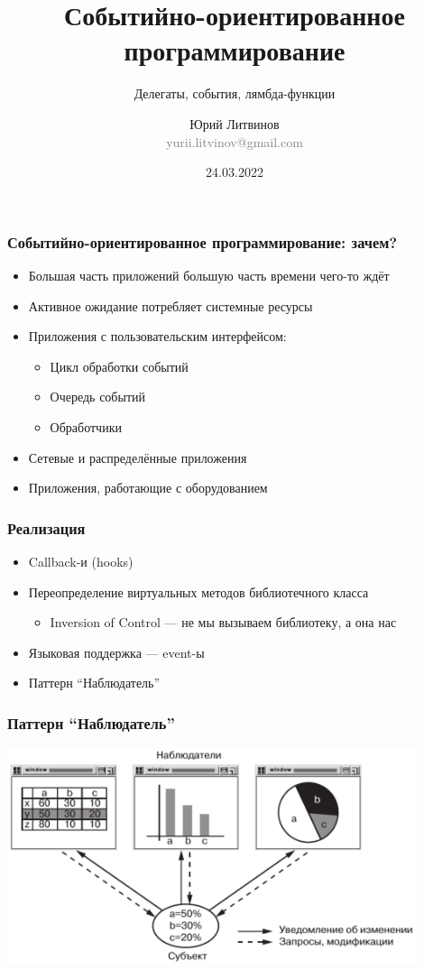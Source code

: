 \documentclass[xetex,mathserif,serif]{beamer}
\title{Событийно-ориентированное программирование}
\subtitle{Делегаты, события, лямбда-функции}
\author[Юрий Литвинов]{Юрий Литвинов\\\small{\textcolor{gray}{yurii.litvinov@gmail.com}}}
\date{24.03.2022}
\begin{document}
    \frame{\titlepage}

        \begin{frame}
        \frametitle{Событийно-ориентированное программирование: зачем?}
        \begin{itemize}
            \item Большая часть приложений большую часть времени чего-то ждёт
            \item Активное ожидание потребляет системные ресурсы
            \item Приложения с пользовательским интерфейсом:
            \begin{itemize}
                \item Цикл обработки событий
                \item Очередь событий
                \item Обработчики
            \end{itemize}
            \item Сетевые и распределённые приложения
            \item Приложения, работающие с оборудованием
        \end{itemize}
    \end{frame}

    \begin{frame}
        \frametitle{Реализация}
        \begin{itemize}
            \item Callback-и (hooks)
            \item Переопределение виртуальных методов библиотечного класса
            \begin{itemize}
                \item Inversion of Control --- не мы вызываем библиотеку, а она нас
            \end{itemize}
            \item Языковая поддержка --- event-ы
            \item Паттерн ``Наблюдатель''
        \end{itemize}
    \end{frame}

    \begin{frame}
        \frametitle{Паттерн ``Наблюдатель''}
        \begin{center}
            \includegraphics[width=0.9\textwidth]{observerExample.png}
        \end{center}
    \end{frame}
\end{document}
